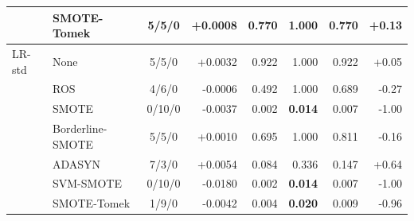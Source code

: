 \documentclass[10pt,a4paper]{article}
\begin{document}
\begin{center}
\begin{longtable}{@{}llcrrrrr@{}}
 & SMOTE-Tomek & 5/5/0 & +0.0008 & 0.770 & 1.000 & 0.770 & +0.13 \\
\midrule
LR-std & None & 5/5/0 & +0.0032 & 0.922 & 1.000 & 0.922 & +0.05 \\
 & ROS & 4/6/0 & -0.0006 & 0.492 & 1.000 & 0.689 & -0.27 \\
 & SMOTE & 0/10/0 & -0.0037 & 0.002 & \textbf{0.014} & 0.007 & -1.00 \\
 & Borderline-SMOTE & 5/5/0 & +0.0010 & 0.695 & 1.000 & 0.811 & -0.16 \\
 & ADASYN & 7/3/0 & +0.0054 & 0.084 & 0.336 & 0.147 & +0.64 \\
 & SVM-SMOTE & 0/10/0 & -0.0180 & 0.002 & \textbf{0.014} & 0.007 & -1.00 \\
 & SMOTE-Tomek & 1/9/0 & -0.0042 & 0.004 & \textbf{0.020} & 0.009 & -0.96 \\
\midrule
\bottomrule\end{longtable}\end{center}
\end{document}
